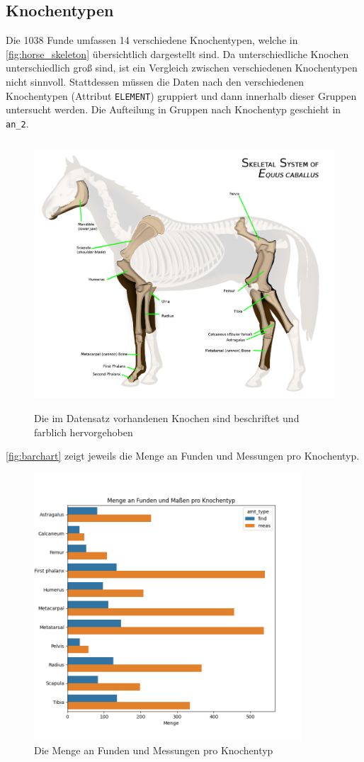 \subsection{Knochentypen}
Die 1038 Funde umfassen 14 verschiedene Knochentypen, welche in  \autoref{fig:horse_skeleton} \cite{WikiSkeletalHorse} übersichtlich dargestellt sind.
Da unterschiedliche Knochen unterschiedlich groß sind, ist ein Vergleich zwischen verschiedenen Knochentypen nicht sinnvoll. 
Stattdessen müssen die Daten nach den verschiedenen Knochentypen (Attribut \texttt{ELEMENT}) gruppiert und dann innerhalb dieser Gruppen untersucht werden.
Die Aufteilung in Gruppen nach Knochentyp geschieht in \texttt{an\_2}. 

\begin{figure}[H]
    \centering
    \includegraphics[height=10cm]{docs/latex/attachments/ab-project_Horse-anatomy.png}
    \caption{Die im Datensatz vorhandenen Knochen sind beschriftet und farblich hervorgehoben}
    \label{fig:horse_skeleton}
\end{figure}

\autoref{fig:barchart} zeigt jeweils die Menge an Funden und Messungen pro Knochentyp.

\begin{figure}[H]
    \centering
    \includegraphics[height=10cm]{results/plots/amounts_barchart.png}
    \caption{Die Menge an Funden und Messungen pro Knochentyp}
    \label{fig:barchart}
\end{figure}

